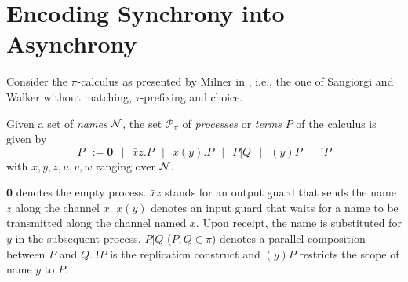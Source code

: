 \documentclass[runningheads]{llncs}
\newcommand{\N} {{\cal N}}               %
\renewcommand{\nu}{}
\newcommand{\pims}{\pi}
\begin{document}
\section{Encoding Synchrony into Asynchrony}\label{sec:pi2api}

\noindent
Consider the $\pi$-calculus as presented by Milner in \cite{Mi92}, i.e., the one of
Sangiorgi and Walker \cite{SW01book} without matching, $\tau$-prefixing and choice.

Given a set of \emph{names} $\N$, the set $\mathcal{P}_\pi$ of \emph{processes} or \emph{terms} $P$
of the calculus is given by\vspace{-2ex}  $$P ::= \textbf{0}  ~~\mid~~ \bar xz.P ~~\mid~~ x(y).P ~~\mid~~ P|Q ~~\mid~~ (\nu y)P ~~\mid~~ !P$$
with $x,y,z,u,v,w$ ranging over $\N$.

$\bm{0}$ denotes the empty process.
$\bar{x}z$ stands for an output guard that sends the name $z$ along the channel $x$.
$x(y)$ denotes an input guard that waits for a name to be transmitted along the channel named $x$.
Upon receipt, the name is substituted for $y$ in the subsequent process.
$P|Q$ ($P, Q \in \pims$) denotes a parallel composition between $P$ and $Q$.
$!P$ is the replication construct and $(y)P$ restricts the scope of name $y$ to $P$.
\end{document}
